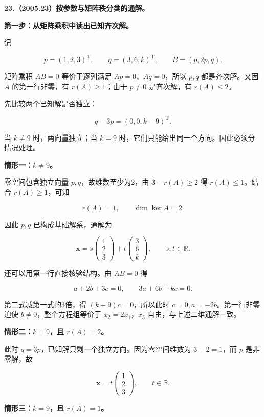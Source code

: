 \documentclass[UTF8,11pt,fontset=windows]{ctexart}
\begin{document}
\textbf{23.（2005.23）按参数与矩阵秩分类的通解。}

\textbf{第一步：从矩阵乘积中读出已知齐次解。}

记

$$
p=(1,2,3)^{\mathrm T},\qquad q=(3,6,k)^{\mathrm T},
\qquad B=(p,2p,q).
$$

矩阵乘积 $AB=0$ 等价于逐列满足 $Ap=0$、$Aq=0$，所以 $p,q$ 都是齐次解。又因 $A$ 的第一行非零，有 $r(A)\ge1$；由于 $p\ne0$ 是齐次解，有 $r(A)\le2$。

先比较两个已知解是否独立：

$$
q-3p=(0,0,k-9)^{\mathrm T}.
$$

当 $k\ne9$ 时，两向量独立；当 $k=9$ 时，它们只能给出同一个方向。因此必须分情况处理。

\textbf{情形一：$k\ne9$。}

零空间包含独立向量 $p,q$，故维数至少为2，由 $3-r(A)\ge2$ 得 $r(A)\le1$。结合 $r(A)\ge1$，可知

$$
r(A)=1,\qquad\dim\ker A=2.
$$

因此 $p,q$ 已构成基础解系，通解为

$$
\boxed{\boldsymbol x=s\begin{pmatrix}1\\2\\3\end{pmatrix}
+t\begin{pmatrix}3\\6\\k\end{pmatrix},\qquad s,t\in\mathbb R.}
$$

还可以用第一行直接核验结构。由 $AB=0$ 得

$$
a+2b+3c=0,\qquad3a+6b+kc=0.
$$

第二式减第一式的3倍，得 $(k-9)c=0$，所以此时 $c=0,a=-2b$。第一行非零迫使 $b\ne0$，整个方程组等价于 $x_2=2x_1$，$x_3$ 自由，与上述二维通解一致。

\textbf{情形二：$k=9$，且 $r(A)=2$。}

此时 $q=3p$，已知解只剩一个独立方向。因为零空间维数为 $3-2=1$，而 $p$ 是非零解，故

$$
\boxed{\boldsymbol x=t\begin{pmatrix}1\\2\\3\end{pmatrix},\qquad t\in\mathbb R.}
$$

\textbf{情形三：$k=9$，且 $r(A)=1$。}
\end{document}
